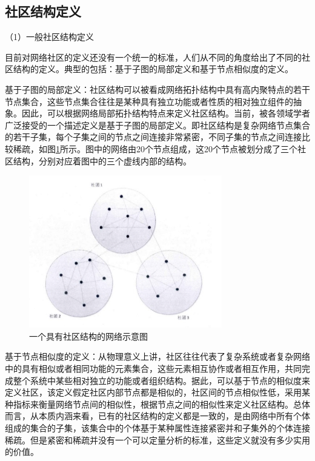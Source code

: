 \subsection{社区结构定义}

（1）一般社区结构定义

目前对网络社区的定义还没有一个统一的标准，人们从不同的角度给出了不同的社区结构的定义。典型的包括：基于子图的局部定义和基于节点相似度的定义。

基于子图的局部定义：社区结构可以被看成网络拓扑结构中具有高内聚特点的若干节点集合，这些节点集合往往是某种具有独立功能或者性质的相对独立组件的抽象。因此，可以根据网络局部拓扑结构特点来定义社区结构。当前，被各领域学者广泛接受的一个描述定义是基于子图的局部定义。即社区结构是复杂网络节点集合的若干子集，每个子集之间的节点之间连接非常紧密，不同子集的节点之间连接比较稀疏，如图\ref{fig:fig2-1}所示。图中的网络由20个节点组成，这20个节点被划分成了三个社区结构，分别对应着图中的三个虚线内部的结构。

\begin{figure}
  \centering
  \includegraphics[width=0.75\textwidth]{figures/fig2-1}
  \caption{一个具有社区结构的网络示意图}\label{fig:fig2-1}
\end{figure}

 基于节点相似度的定义：从物理意义上讲，社区往往代表了复杂系统或者复杂网络中的具有相似或者相同功能的元素集合，这些元素相互协作或者相互作用，共同完成整个系统中某些相对独立的功能或者组织结构。据此，可以基于节点的相似度来定义社区，该定义假定社区内部节点都是相似的，社区间的节点相似性低，采用某种指标来衡量网络节点间的相似性，根据节点之间的相似性来定义社区结构。总体而言，从本质内涵来看，已有的社区结构的定义都是一致的，是由网络中所有个体组成的集合的子集，该集合中的个体基于某种属性连接紧密并和子集外的个体连接稀疏。但是紧密和稀疏并没有一个可以定量分析的标准，这些定义就没有多少实用的价值。


